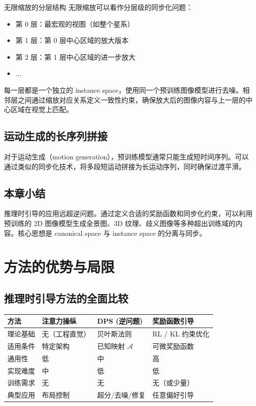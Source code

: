 \documentclass[a4paper]{article}
\begin{document}
\begin{knowledgebox}{无限缩放的分层结构}
无限缩放可以看作分层级的同步化问题：
\begin{itemize}
    \item 第 0 层：最宏观的视图（如整个星系）
    \item 第 1 层：第 0 层中心区域的放大版本
    \item 第 2 层：第 1 层中心区域的进一步放大
    \item $\ldots$
\end{itemize}
每一层都是一个独立的 instance space，使用同一个预训练图像模型进行去噪。相邻层之间通过缩放对应关系定义一致性约束，确保放大后的图像内容与上一层的中心区域在视觉上匹配。
\end{knowledgebox}

\subsection{运动生成的长序列拼接}

对于运动生成（motion generation），预训练模型通常只能生成短时间序列。可以通过类似的同步化技术，将多段短运动拼接为长运动序列，同时确保过渡平滑。

\subsection{本章小结}

推理时引导的应用远超逆问题。通过定义合适的奖励函数和同步化约束，可以利用预训练的 2D 图像模型生成全景图、3D 纹理、歧义图像等多种超出训练域的内容。核心思想是 canonical space 与 instance space 的分离与同步。

\section{方法的优势与局限}

\subsection{推理时引导方法的全面比较}

\begin{center}
\begin{tabular}{p{3cm}p{3.5cm}p{3.5cm}p{3.5cm}}
\toprule
\textbf{方法} & \textbf{注意力操纵} & \textbf{DPS (逆问题)} & \textbf{奖励函数引导} \\
\midrule
理论基础 & 无（工程直觉） & 贝叶斯法则 & RL / KL 约束优化 \\
适用条件 & 特定架构 & 已知映射 $\mathcal{A}$ & 可微奖励函数 \\
通用性 & 低 & 中 & 高 \\
实现难度 & 中 & 低 & 低 \\
训练需求 & 无 & 无 & 无（或少量） \\
典型应用 & 布局控制 & 超分/去噪/修复 & 任意偏好引导 \\
\bottomrule
\end{tabular}
\end{center}
\end{document}
